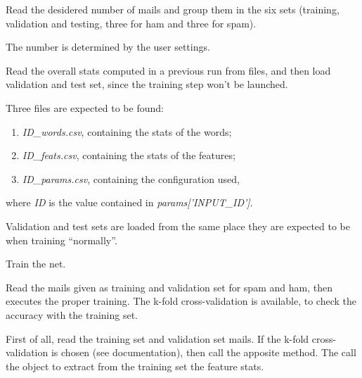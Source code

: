 \documentclass[letterpaper,10pt,english]{sphinxmanual}
\begin{document}
\begin{fulllineitems}
\begin{fulllineitems}
\label{index:naive_bayes.Bayes.load_mails}
Read the desidered number of mails and group them in the six sets
(training, validation and testing, three for ham and three for spam).

The number is determined by the user settings.

\end{fulllineitems}


\begin{fulllineitems}
\label{index:naive_bayes.Bayes.read_bayes}
Read the overall stats computed in a previous run from files, and then
load validation and test set, since the training step won't be launched.

Three files are expected to be found:
\begin{enumerate}
\item {} 
\emph{ID\_words.csv}, containing the stats of the words;

\item {} 
\emph{ID\_feats.csv}, containing the stats of the features;

\item {} 
\emph{ID\_params.csv}, containing the configuration used,

\end{enumerate}

where \emph{ID} is the value contained in \emph{params{[}'INPUT\_ID'{]}}.

Validation and test sets are loaded from the same place they are
expected to be when training ``normally''.

\end{fulllineitems}


\begin{fulllineitems}
\label{index:naive_bayes.Bayes.train}
Train the net.

Read the mails given as training and validation set for spam and ham,
then executes the proper training. The k-fold cross-validation is
available, to check the accuracy with the training set.

First of all, read the training set and validation set mails.
If the k-fold cross-validation is chosen (see {\hyperref[index:config.Config]{}}
documentation), then call the apposite method. The call the
{\hyperref[index:trainer.Trainer]{}} object to extract from the training set
the feature stats.


\end{fulllineitems}
\end{fulllineitems}
\end{document}
